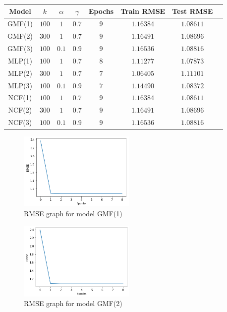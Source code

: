 \documentclass[final]{cvpr}
\begin{document}
\begin{tabular}{|c|c|c|c|c|c|c|c|}
	\hline
	Model & $k$ & $\alpha$ & $\gamma$ & Epochs & Train RMSE & Test RMSE
	\\ \hline
	GMF(1) & $100$ & $1$ & $0.7$ & $9$ & $1.16384$ & $1.08611$
	\\ \hline
	GMF(2) & $300$ & $1$ & $0.7$ & $9$ & $1.16491$ & $1.08696$
	\\ \hline
	GMF(3) & $100$ & $0.1$ & $0.9$ & $9$ & $1.16536$ & $1.08816$
	\\ \hline
	MLP(1) & $100$ & $1$ & $0.7$ & $8$ & $1.11277$ & $1.07873$
	\\ \hline
	MLP(2) & $300$ & $1$ & $0.7$ & $7$ & $1.06405$ & $1.11101$
	\\ \hline
	MLP(3) & $100$ & $0.1$ & $0.9$ & $7$ & $1.14490$ & $1.08372$
	\\ \hline
	NCF(1) & $100$ & $1$ & $0.7$ & $9$ & $1.16384$ & $1.08611$
	\\ \hline
	NCF(2) & $300$ & $1$ & $0.7$ & $9$ & $1.16491$ & $1.08696$
	\\ \hline
	NCF(3) & $100$ & $0.1$ & $0.9$ & $9$ & $1.16536$ & $1.08816$
	\\ \hline
\end{tabular}

\begin{figure}
	\includegraphics[width=0.5\textwidth]{screenshot20210415234153.png}
	\caption{RMSE graph for model GMF(1)}
\end{figure}

\begin{figure}
	\includegraphics[width=0.5\textwidth]{screenshot20210415234346.png}
	\caption{RMSE graph for model GMF(2)}
\end{figure}
\end{document}
